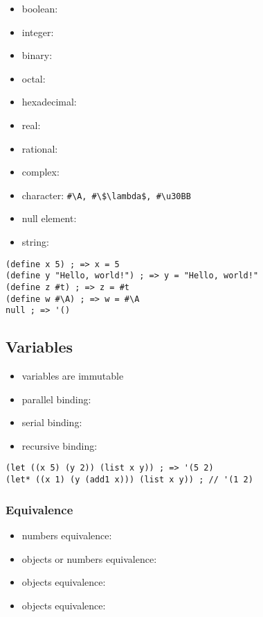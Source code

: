 \documentclass[a4paper,landscape,10pt]{article}
\begin{document}
\begin{multicols*}{2}
  \begin{itemize}
    \item boolean: 
    \item integer: 
    \item binary: 
    \item octal: 
    \item hexadecimal: 
    \item real: 
    \item rational: 
    \item complex: 
    \item character: \lstinline[language=Racket]!#\A, #\$\lambda$, #\u30BB!
    \item null element: 
    \item string: 
  \end{itemize}

  \begin{lstlisting}[language=Racket]
(define x 5) ; => x = 5
(define y "Hello, world!") ; => y = "Hello, world!"
(define z #t) ; => z = #t
(define w #\A) ; => w = #\A
null ; => '()
\end{lstlisting}

  \subsection{Variables}

  \begin{itemize}
    \item variables are immutable
    \item parallel binding: 
    \item serial binding: 
    \item recursive binding: 
  \end{itemize}

  \begin{lstlisting}[language=Racket]
(let ((x 5) (y 2)) (list x y)) ; => '(5 2)
(let* ((x 1) (y (add1 x))) (list x y)) ; // '(1 2)
\end{lstlisting}

  \subsubsection{Equivalence}

  \begin{itemize}
    \item numbers equivalence: \iracket{=}
    \item objects or numbers equivalence: 
    \item objects equivalence: 
    \item objects equivalence: 
  \end{itemize}


\end{multicols*}
\end{document}
